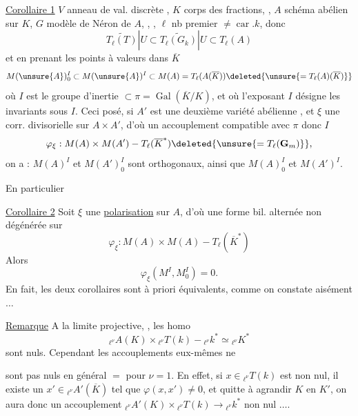 \uline{Corollaire 1} $V$ anneau de val. discrète , $K$ corps des fractions, , $A$ schéma abélien sur $K$, $G$ modèle de Néron de $A$, , , $\ell$ nb premier $\ne\operatorname{car}.k$,  donc
\[
\widetilde{T_\ell(T)}|U\subset\widetilde{T_\ell(G_k)}|U\subset T_\ell(A)
\]
et en prenant les points à valeurs dans $\overline K$
\[
M(\unsure{A})_0^I\subset M(\unsure{A})^I\subset M(A)=T_\ell(A(\overline K))\deleted{\unsure{=T_\ell(A)(\overline K)}}
\]
où $I$ est le groupe d'inertie $\subset\pi=\operatorname{Gal}(\overline K/K)$, et où l'exposant $I$ désigne les invariants sous $I$.
Ceci posé, si $A'$ est une deuxième variété abélienne , et $\xi$ une  corr. divisorielle sur $A\times A'$, d'où un accouplement compatible avec $\pi$ donc $I$
\[
\varphi_\xi:M(A)\times M(A')\mathbin{-}T_\ell(\overline K^*)\deleted{\unsure{=T_\ell(\mathbf G_m)}},
\]
on a :  $M(A)^I$ et $M(A')_0^I$ sont orthogonaux, ainsi que $M(A)_0^I$ et $M(A')^I$.

En particulier

\uline{Corollaire 2} Soit $\xi$ une \uline{polarisation} sur $A$, d'où une forme bil. alternée non dégénérée sur
\[
\varphi_\xi:M(A)\times M(A)\mathbin{-}T_\ell(\overline K^*)
\]
Alors
\[
\varphi_\xi(M^I,M_0^I)=0.
\]
En fait, les deux corollaires sont à priori équivalents, comme on constate aisément $\ldots$

\uline{Remarque} A la limite projective, , les homo
\[
{}_{\ell^\nu}A(K)\times{}_{\ell^\nu}T(k)\mathbin{-}{}_{\ell^\nu}k^*\simeq{}_{\ell^\nu}K^*
\]
sont nuls. Cependant les accouplements eux-mêmes ne

sont pas nuls en général $=$ pour $\nu=1$. En effet,
si  $x\in{}_{\ell^\nu}T(k)$ est non nul, il existe un
$x'\in{}_{\ell^\nu}A'(\overline K)$ tel que \deleted{\unsure{$\varphi$}} $\varphi(x,x')\ne0$, et  quitte
à agrandir $K$ en $K'$, on aura donc un
accouplement ${}_{\ell^\nu}A'(K)\times{}_{\ell^\nu}T(k)\longrightarrow{}_{\ell^\nu}k^*$ non nul $\ldots$.

